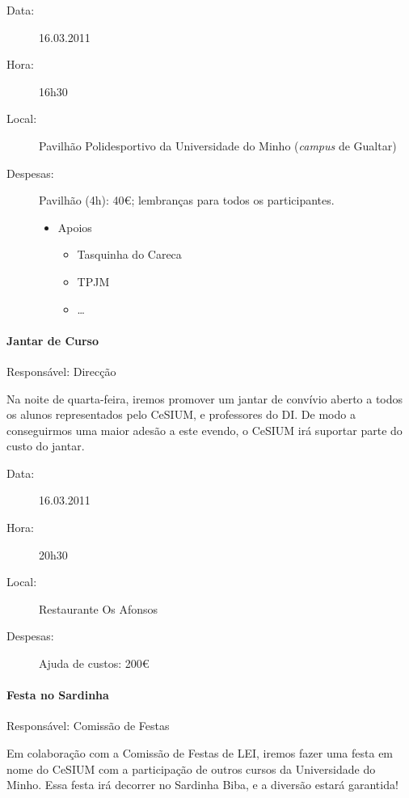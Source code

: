 \begin{description}
	\item[Data:] 16.03.2011
	\item[Hora:] 16h30
	\item[Local:] Pavilhão Polidesportivo da Universidade do Minho (\emph{campus} de Gualtar)
	\item[Despesas:] Pavilhão (4h): 40\euro; lembranças para todos os participantes.
	\begin{itemize}
		\item Apoios
		\begin{itemize}
			\item Tasquinha do Careca
			\item TPJM
			\item \dots  
		\end{itemize}
	\end{itemize}
\end{description}


\paragraph{Jantar de Curso}
Responsável: Direcção

Na noite de quarta-feira, iremos promover um jantar de convívio aberto a todos os alunos representados pelo CeSIUM, e professores do DI. De modo a conseguirmos uma maior adesão a este evendo, o CeSIUM irá suportar parte do custo do jantar.

\begin{description}
	\item[Data:] 16.03.2011
	\item[Hora:] 20h30
	\item[Local:] Restaurante Os Afonsos
	\item[Despesas:] Ajuda de custos: 200\euro
\end{description}


\paragraph{Festa no Sardinha}
Responsável: Comissão de Festas

Em colaboração com a Comissão de Festas de LEI, iremos fazer uma festa em nome do CeSIUM com a participação de outros cursos da Universidade do Minho. Essa festa irá decorrer no Sardinha Biba, e a diversão estará garantida!

